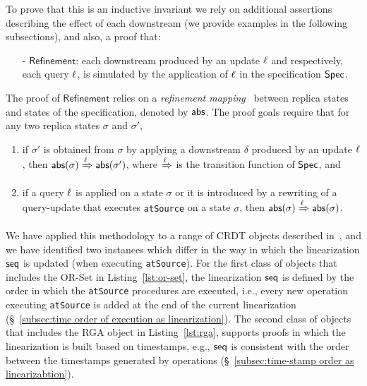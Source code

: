 To prove that this is an inductive invariant we rely on additional
assertions describing the effect of each downstream (we provide
examples in the following subsections), and also, a proof that:
\begin{itemize}
\item[-] $\mathsf{Refinement}$: each downstream produced by an update $\ell$ and respectively, each query $\ell$, is simulated by the application of $\ell$ in the specification $\mathsf{Spec}$.
\end{itemize}
The proof of $\mathsf{Refinement}$ relies on a \emph{refinement
  mapping}~\cite{AbadiL91} between replica states and states of the
specification, denoted by $\mathsf{abs}$. The proof goals require that for
any two replica states $\sigma$ and $\sigma'$,
\begin{enumerate}
        \item if $\sigma'$ is obtained from $\sigma$ by applying a
          downstream $\delta$ produced by an update $\ell$, then
          \mbox{$\mathsf{abs}(\sigma)\xRightarrow{\ensuremath{\ell}}\mathsf{abs}(\sigma')$},
          where $\xRightarrow{\ensuremath{\ell}}$ is the transition function of
          $\mathsf{Spec}$, and
        \item if a query $\ell$ is applied on a state $\sigma$ or
          it is introduced by a rewriting of a query-update that
          executes {\tt atSource} on a state $\sigma$, then
          $\mathsf{abs}(\sigma)\xRightarrow{\ensuremath{\ell}}\mathsf{abs}(\sigma)$.
\end{enumerate}

We have applied this methodology to a range of CRDT objects described in~\cite{ShapiroPBZ11}, and we have identified two instances which differ in the way in which the linearization $\mathsf{seq}$ is updated (when executing {\tt atSource}). For the first class of objects that includes the OR-Set in Listing~\ref{lst:or-set}, the linearization $\mathsf{seq}$ is defined by the order in which the {\tt atSource} procedures are executed, i.e., every new operation executing {\tt atSource} is added at the end of the current linearization (\S~\ref{subsec:time order of execution as linearization}).
The second class of objects that includes the RGA object in Listing~\ref{lst:rga}, supports \CRDTLinshort{} proofs in which the linearization is built based on timestamps, e.g., $\mathsf{seq}$ is consistent with the order between the timestamps generated by operations (\S~\ref{subsec:time-stamp order as linearizabtion}).

